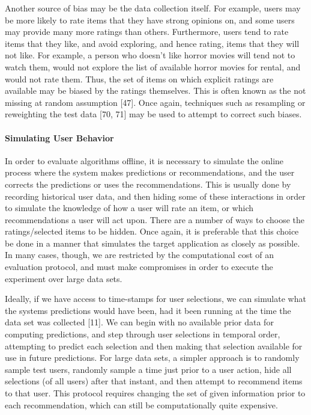 Another source of bias may be the data collection itself. For example, users may be more likely to rate items that they have strong opinions on, and some users may provide many more ratings than others. Furthermore, users tend to rate items that they like, and avoid exploring, and hence rating, items that they will not like. For example, a person who doesn’t like horror movies will tend not to watch them, would not explore the list of available horror movies for rental, and would not rate them. Thus, the set of items on which explicit ratings are available may be biased by the ratings themselves. This is often known as the not missing at random assumption [47]. Once again, techniques such as resampling or reweighting the test data [70, 71] may be used to attempt to correct such biases.

\paragraph{Simulating User Behavior}

In order to evaluate algorithms offline, it is necessary to simulate the online process where the system makes predictions or recommendations, and the user corrects the predictions or uses the recommendations. This is usually done by recording historical user data, and then hiding some of these interactions in order to simulate the knowledge of how a user will rate an item, or which recommendations a user will act upon. There are a number of ways to choose the ratings/selected items to be hidden. Once again, it is preferable that this choice be done in a manner that simulates the target application as closely as possible. In many cases, though, we are restricted by the computational cost of an evaluation protocol, and must make compromises in order to execute the experiment over large data sets.

Ideally, if we have access to time-stamps for user selections, we can simulate what the systems predictions would have been, had it been running at the time the data set was collected [11]. We can begin with no available prior data for computing predictions, and step through user selections in temporal order, attempting to predict each selection and then making that selection available for use in future predictions. For large data sets, a simpler approach is to randomly sample test users, randomly sample a time just prior to a user action, hide all selections (of all users) after that instant, and then attempt to recommend items to that user. This protocol requires changing the set of given information prior to each recommendation, which can still be computationally quite expensive.

